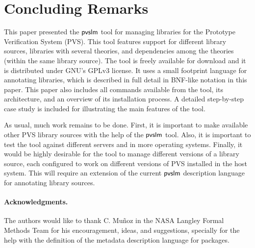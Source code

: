 \section{Concluding Remarks}
\label{sec.concl}

This paper presented the $\textsf{pvslm}$ tool for managing libraries for the
Prototype Verification System (PVS). This tool features support for
different library sources, libraries with several theories, and
dependencies among the theories (within the same library source).  The
tool is freely available for download and it is distributed under
GNU's GPLv3 license. It uses a small footprint language for
annotating libraries, which is described in full detail in BNF-like
notation in this paper. This paper also includes all commands
available from the tool, its architecture, and an overview of its
installation process.  A detailed step-by-step case study is included
for illustrating the main features of the tool.

As usual, much work remains to be done. First, it is important to make
available other PVS library sources with the help of the $\textsf{pvslm}$
tool.  Also, it is important to test the tool against different
servers and in more operating systems. Finally, it would be highly
desirable for the tool to manage different versions of a library
source, each configured to work on different versions of PVS installed
in the host system. This will require an extension of the current
$\textsf{pvslm}$ description language for annotating library sources.

\paragraph{\bf Acknowledgments.} The authors would like to thank
C. Mu\~noz in the NASA Langley Formal Methods Team for his
encouragement, ideas, and suggestions, specially for the help with the
definition of the metadata description language for packages.
